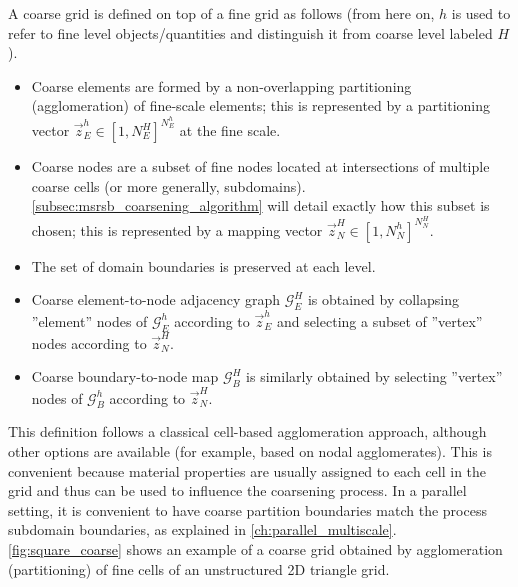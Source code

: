 A coarse grid is defined on top of a fine grid as follows (from here on, $h$ is used to refer to fine level objects/quantities and distinguish it from coarse level labeled $H$).
\begin{itemize}
    \item Coarse elements are formed by a non-overlapping partitioning (agglomeration) of fine-scale elements; this is represented by a partitioning vector $\vec{z}_E^h \in [1,N_E^H]^{N_E^h}$ at the fine scale.
    \item Coarse nodes are a subset of fine nodes located at intersections of multiple coarse cells (or more generally, subdomains). \autoref{subsec:msrsb_coarsening_algorithm} will detail exactly how this subset is chosen; this is represented by a mapping vector $\vec{z}_N^H \in [1,N_N^h]^{N_N^H}$.
    \item The set of domain boundaries is preserved at each level.
    \item Coarse element-to-node adjacency graph $\mathcal{G}_E^H$ is obtained by collapsing ''element'' nodes of $\mathcal{G}_E^h$ according to $\vec{z}_E^h$ and selecting a subset of ''vertex'' nodes according to $\vec{z}_N^H$.
    \item Coarse boundary-to-node map $\mathcal{G}_B^H$ is similarly obtained by selecting ''vertex'' nodes of $\mathcal{G}_B^h$ according to $\vec{z}_N^H$.
\end{itemize}
This definition follows a classical cell-based agglomeration approach, although other options are available (for example, based on nodal agglomerates).   This is convenient because material properties are usually assigned to each cell in the grid and thus can be used to influence the coarsening process.   In a parallel setting, it is convenient to have coarse partition boundaries match the process subdomain boundaries, as explained in \autoref{ch:parallel_multiscale}.   \autoref{fig:square_coarse} shows an example of a coarse grid obtained by agglomeration (partitioning) of fine cells of an unstructured 2D triangle grid.

